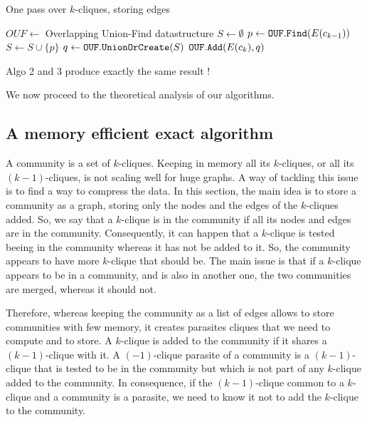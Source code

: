 \begin{algorithm}[!htbp]
\caption{One pass over $k$-cliques, storing edges}
\label{algo:ckcom3}
\begin{algorithmic}[1]
\State $OUF \leftarrow$ Overlapping Union-Find datastructure 
	\State $S\leftarrow \emptyset$
        \State $p \leftarrow {\tt OUF.Find}(E(c_{k-1}))$%
        	\State $S \leftarrow S\cup \{p\}$
        \EndIf
    \EndFor
    \State $q\leftarrow {\tt OUF.UnionOrCreate}(S)$
	\State ${\tt OUF.Add}(E(c_k),q)$ 
\EndFor
\end{algorithmic}
\end{algorithm}


{\color{red} 
Algo 2 and 3 produce exactly the same result !
}





We now proceed to the theoretical analysis of our algorithms.



\subsection{A memory efficient exact algorithm}

A community is a set of $k$-cliques. Keeping in memory all its $k$-cliques, or all its $(k-1)$-cliques, is not scaling well for huge graphs. A way of tackling this issue is to find a way to compress the data. In this section, the main idea is to store a community as a graph, storing only the nodes and the edges of the $k$-cliques added. So, we say that a $k$-clique is in the community if all its nodes and edges are in the community. Consequently, it can happen that a $k$-clique is tested beeing in the community whereas it has not be added to it. So, the community appears to have more $k$-clique that should be. The main issue is that if a $k$-clique appears to be in a community, and is also in another one, the two communities are merged, whereas it should not.

Therefore, whereas keeping the community as a list of edges allows to store communities with few memory, it creates parasites cliques that we need to compute and to store. A $k$-clique is added to the community if it shares a $(k-1)$-clique with it. A $(-1)$-clique parasite of a community is a $(k-1)$-clique that is tested to be in the community but which is not part of any $k$-clique added to the community. In consequence, if the $(k-1)$-clique common to a $k$-clique and a community is a parasite, we need to know it not to add the $k$-clique to the community.

